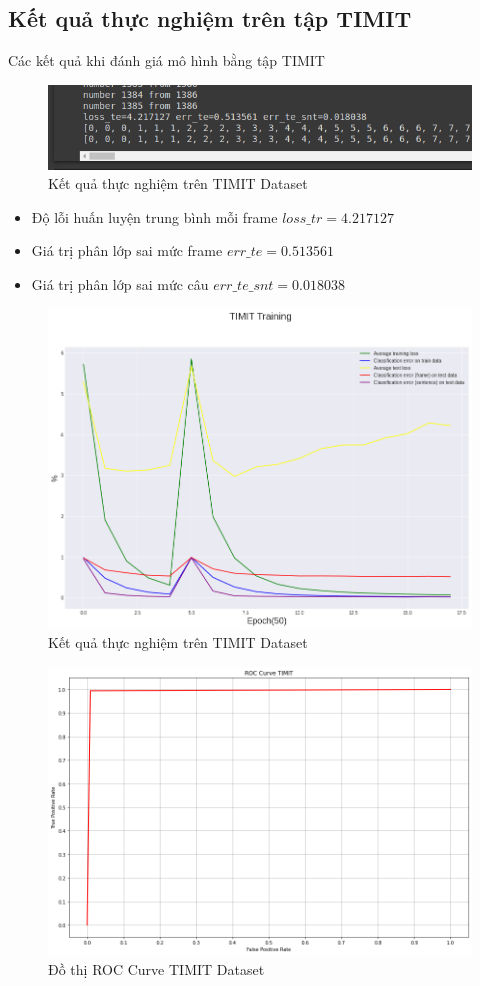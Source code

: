 \documentclass{article}
\begin{document}
	\subsection{Kết quả thực nghiệm trên tập TIMIT}
	Các kết quả khi đánh giá mô hình bằng tập TIMIT
	\begin{figure}[H]
		\centering
		\includegraphics[width=.75\textwidth]{result/evaluate_result_timit.png}
		\caption{Kết quả thực nghiệm trên TIMIT Dataset}
		\label{fig:writing-thesis}
	\end{figure}
	\begin{itemize}
		\item Độ lỗi huấn luyện trung bình mỗi frame $loss\_tr=4.217127$
		\item Giá trị phân lớp sai mức frame $err\_te=0.513561$
		\item Giá trị phân lớp sai mức câu $err\_te\_snt =0.018038$
	\end{itemize}
	\begin{figure}[H]
		\centering
		\includegraphics[width=.75\textwidth]{result/sincnet_timit_plot.png}
		\caption{Kết quả thực nghiệm trên TIMIT Dataset}
		\label{fig:writing-thesis}
	\end{figure}
	\begin{figure}[H]
		\centering
		\includegraphics[width=.75\textwidth]{result/roc_curve_timit.png}
		\caption{Đồ thị ROC Curve TIMIT Dataset}
		\label{fig:writing-thesis}
	\end{figure}
\end{document}
